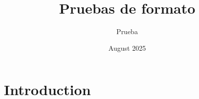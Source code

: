 \documentclass{article}
\begin{document}
\begin{titlepage}
\title{Pruebas de formato}
\author{Prueba}
\date{August 2025}

\end{titlepage}
\maketitle
\newpage

\tableofcontents

\section{Introduction}
\end{document}
